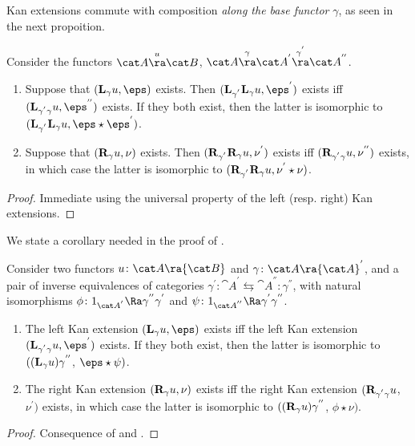 Kan extensions commute with composition {\it along the base functor} $\gamma$, as seen in the next propoition.

\begin{prop}
\label{prop:basecompositionkanextension}
Consider the functors ${\cat A} \overset{u}{\ra} {\cat B}$, ${\cat A} \overset{\gamma}{\ra} {\cat A}^{'} \overset{\gamma^{'}}{\ra} {\cat A}^{''}$.
\begin{enumerate}
\item
Suppose that $({\bf L}_\gamma u, \eps)$ exists. Then $({\bf L}_{\gamma^{'}} {\bf L}_\gamma u, \eps^{'})$ exists iff $({\bf L}_{\gamma^{'}\gamma} u, \eps^{''})$ exists. If they both exist, then the latter is isomorphic to $({\bf L}_{\gamma^{'}}{\bf L}_\gamma u, \eps \star \eps^{'})$.
\item
Suppose that $({\bf R}_\gamma u, \nu)$ exists. Then $({\bf R}_{\gamma^{'}} {\bf R}_\gamma u, \nu^{'})$ exists iff $({\bf R}_{\gamma^{'}\gamma} u, \nu^{''})$ exists, in which case the latter is isomorphic to $({\bf R}_{\gamma^{'}}{\bf R}_\gamma u, \nu^{'} \star \nu)$.
\end{enumerate}
\end{prop}

\begin{proof}
Immediate using the universal property of the left (resp. right) Kan extensions. 
\end{proof}

We state a corollary needed in the proof of .
\begin{cor}
\label{cor:neededbygenhomlim}
Consider two functors $u \colon {\cat A} \ra {\cat B}$ and $\gamma \colon {\cat A} \ra {\cat A}^{'}$, and a pair of inverse equivalences of categories $\gamma^{'} : {\cat A}^{'} \leftrightarrows {\cat A}^{''} : \gamma^{''}$, with natural isomorphisms $\phi \colon 1_{{\cat A}^{'}} \Ra \gamma^{''}\gamma^{'}$ and $\psi \colon 1_{{\cat A}^{''}} \Ra \gamma^{'}\gamma^{''}$.
\begin{enumerate}
\item
The left Kan extension $({\bf L}_\gamma u, \eps)$ exists iff the left Kan extension  $({\bf L}_{{\gamma}^{'}\gamma} u, \eps^{'})$ exists. If they both exist, then the latter is isomorphic to $(({\bf L}_\gamma u) \gamma^{''}$, $\eps \star \psi)$.
\item
The right Kan extension $({\bf R}_\gamma u, \nu)$ exists iff the right Kan extension $({\bf R}_{{\gamma}^{'}\gamma} u$, $\nu^{'})$ exists, in which case the latter is isomorphic to $(({\bf R}_\gamma u) \gamma^{''}$, $\phi \star \nu)$.
\end{enumerate}
\end{cor}

\begin{proof}
Consequence of  and .
\end{proof}

